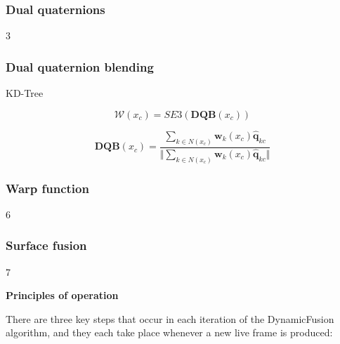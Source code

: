 \documentclass[12pt,twoside]{report}
\begin{document}
\subsubsection{Dual quaternions}

3


\subsubsection{Dual quaternion blending}

KD-Tree

$$\mathcal{W}(x_c) = SE3(\textbf{DQB}(x_c))$$

$$\textbf{DQB}(x_c) = \frac{\sum_{k \in N(x_c)} \textbf{w}_k(x_c)\hat{\textbf{q}}_{kc}}{\Vert \sum_{k \in N(x_c)} \textbf{w}_k(x_c)\hat{\textbf{q}}_{kc} \Vert}$$

\subsubsection{Warp function}

6

\subsubsection{Surface fusion}

7

\noindent\textbf{Principles of operation}


There are three key steps that occur in each iteration of the DynamicFusion algorithm, and they each take place whenever a new live frame is produced:
\end{document}
